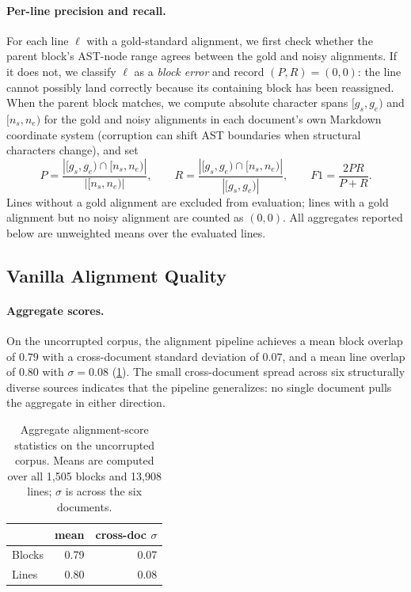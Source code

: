 \documentclass{article}
\theoremstyle{definition}
\begin{document}
\paragraph{Per-line precision and recall.}
For each line $\ell$ with a gold-standard alignment, we first check
whether the parent block's AST-node range agrees between the gold and
noisy alignments.  If it does not, we classify $\ell$ as a
\emph{block error} and record $(P, R) = (0, 0)$: the line cannot
possibly land correctly because its containing block has been
reassigned.  When the parent block matches, we compute absolute
character spans $[g_s, g_e)$ and $[n_s, n_e)$ for the gold and noisy
alignments in each document's own Markdown coordinate system
(corruption can shift AST boundaries when structural characters
change), and set
\[
      P = \frac{|[g_s, g_e) \cap [n_s, n_e)|}{|[n_s, n_e)|},
      \qquad
      R = \frac{|[g_s, g_e) \cap [n_s, n_e)|}{|[g_s, g_e)|},
      \qquad
      F1 = \frac{2PR}{P + R}.
\]
Lines without a gold alignment are excluded from evaluation; lines
with a gold alignment but no noisy alignment are counted as $(0, 0)$.
All aggregates reported below are unweighted means over the evaluated
lines.

\subsection{Vanilla Alignment Quality}
\label{sec:bench-vanilla}

\paragraph{Aggregate scores.}
On the uncorrupted corpus, the alignment pipeline achieves a mean block
overlap of $0.79$ with a cross-document standard deviation of $0.07$,
and a mean line overlap of $0.80$ with $\sigma = 0.08$
(\cref{tab:bench-vanilla-agg}).  The small cross-document spread across
six structurally diverse sources indicates that the pipeline
generalizes: no single document pulls the aggregate in either
direction.

\begin{table}[h]
      \centering
      \small
      \begin{tabular}{lrr}
            \toprule
                   & \textbf{mean} & \textbf{cross-doc $\sigma$} \\
            \midrule
            Blocks & 0.79          & 0.07                        \\
            Lines  & 0.80          & 0.08                        \\
            \bottomrule
      \end{tabular}
      \caption{Aggregate alignment-score statistics on the uncorrupted
            corpus.  Means are computed over all 1{,}505 blocks and 13{,}908
            lines; $\sigma$ is across the six documents.}
      \label{tab:bench-vanilla-agg}
\end{table}
\end{document}
